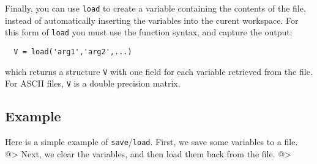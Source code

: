 Finally, you can use \verb|load| to create a variable containing the 
contents of the file, instead of automatically inserting the variables
into the curent workspace.  For this form of \verb|load| you must use the
function syntax, and capture the output:
\begin{verbatim}
  V = load('arg1','arg2',...)
\end{verbatim}
which returns a structure \verb|V| with one field for each variable
retrieved from the file.  For ASCII files, \verb|V| is a double precision
matrix.

\subsection{Example}

Here is a simple example of \verb|save|/\verb|load|.  First, we save some variables to a file.
@>
Next, we clear the variables, and then load them back from the file.
@>
